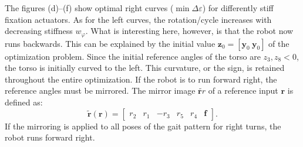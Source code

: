\documentclass[10pt,a4paper]{article}
\begin{document}
The figures (d)--(f) show optimal right curves ($\min \Delta \varepsilon$) for differently stiff fixation actuators.
As for the left curves, the rotation/cycle increases with decreasing stiffness $w_\varphi$.
What is interesting here, however, is that the robot now runs backwards.
This can be explained by the initial value $\bm{z}_0 = [\bm{y}_0~\bm{y}_0]$ of the optimization problem.
Since the initial reference angles of the torso are $z_3, z_8 < 0$, the torso is initially curved to the left. 
This curvature, or the sign, is retained throughout the entire optimization.
If the robot is to run forward right, the reference angles must be mirrored.
The mirror image $\tilde{\bm{r}{r}}$ of a reference input $\bm{r}$ is defined as:
\begin{equation}
\tilde{\bm{r}}(\bm{r}) = \begin{bmatrix}
r_2 & r_1 & - r_3 & r_5 & r_4  & \bm{f}
\end{bmatrix} .
\end{equation}
If the mirroring is applied to all poses of the gait pattern for right turns, the robot runs forward right.
\end{document}
